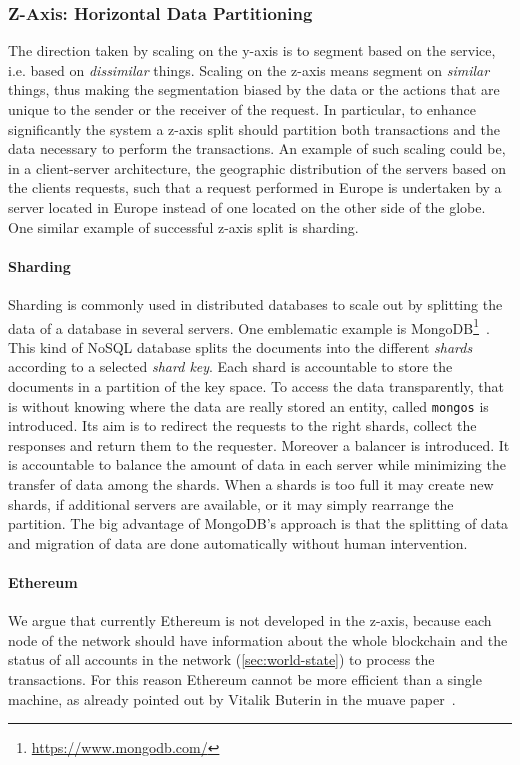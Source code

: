 \subsubsection{Z-Axis: Horizontal Data Partitioning}

The direction taken by scaling on the y-axis is to segment based on the service,
i.e. based on \emph{dissimilar} things. Scaling on the z-axis means segment on
\emph{similar} things, thus making the segmentation biased by the data or the
actions that are unique to the sender or the receiver of the request. In
particular, to enhance significantly the system a z-axis split should partition
both transactions and the data necessary to perform the transactions. 
An example of such scaling could be, in a client-server architecture, the 
geographic distribution of the servers based on the clients requests, such that 
a request performed in Europe is undertaken by a server located in Europe 
instead of one located on the other side of the globe. One similar example of
successful z-axis split is sharding.

\paragraph{Sharding} 
Sharding is commonly used in distributed databases to scale out by splitting
the data of a database in several servers. One emblematic example is
MongoDB\footnote{\url{https://www.mongodb.com/}}~\cite{bib:mongodb}. This kind
of NoSQL database splits the documents into the different \emph{shards}
according to a selected \emph{shard key}. Each shard is accountable to store 
the documents in a partition of the key space. To access the data 
transparently, that is without knowing where the data are really stored an
entity, called \texttt{mongos} is introduced. Its aim is to redirect the
requests to the right shards, collect the responses and return them to the
requester. Moreover a balancer is introduced. It is accountable to balance the 
amount of data in each server while minimizing the transfer of data among the 
shards. When a shards is too full it may create new shards, if additional
servers are available, or it may simply rearrange the partition. 
The big advantage of MongoDB's approach is that the splitting of data and
migration of data are done automatically without human intervention.






\paragraph{Ethereum} We argue that currently Ethereum is not developed in the
z-axis, because each node of the network should have information about the whole
blockchain and the status of all accounts in the network 
(\autoref{sec:world-state}) to process the transactions. For this reason 
Ethereum cannot be more efficient than a single machine, as already pointed out 
by Vitalik Buterin in the muave paper~\cite{bib:mauve}.

